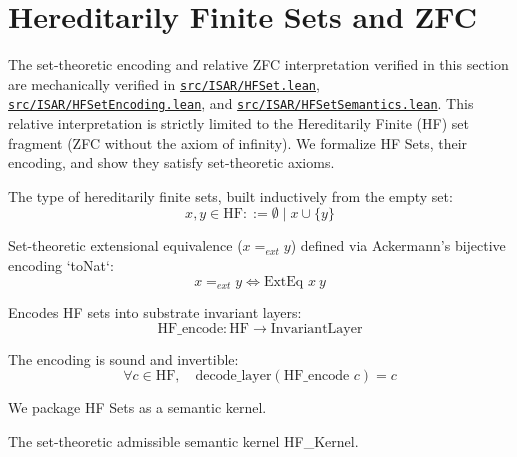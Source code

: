 \section{Hereditarily Finite Sets and ZFC}

The set-theoretic encoding and relative ZFC interpretation verified in this section are mechanically verified in \href{https://github.com/cypoe/isar-proofs/blob/master/src/ISAR/HFSet.lean}{\texttt{src/ISAR/HFSet.lean}}, \href{https://github.com/cypoe/isar-proofs/blob/master/src/ISAR/HFSetEncoding.lean}{\texttt{src/ISAR/HFSetEncoding.lean}}, and \href{https://github.com/cypoe/isar-proofs/blob/master/src/ISAR/HFSetSemantics.lean}{\texttt{src/ISAR/HFSetSemantics.lean}}. This relative interpretation is strictly limited to the Hereditarily Finite (HF) set fragment (ZFC without the axiom of infinity). We formalize HF Sets, their encoding, and show they satisfy set-theoretic axioms.

\begin{definition}[HF Sets]
The type of hereditarily finite sets, built inductively from the empty set:
$$x, y \in \text{HF} ::= \emptyset \mid x \cup \{y\}$$
\end{definition}

\begin{definition}
Set-theoretic extensional equivalence ($x =_{ext} y$) defined via Ackermann's bijective encoding `toNat`:
$$x =_{ext} y \iff \text{ExtEq } x\ y$$
\end{definition}

\begin{definition}
Encodes HF sets into substrate invariant layers:
$$\text{HF\_encode} : \text{HF} \to \text{InvariantLayer}$$
\end{definition}

\begin{theorem}
The encoding is sound and invertible:
$$\forall c \in \text{HF}, \quad \text{decode\_layer}(\text{HF\_encode } c) = c$$
\end{theorem}

We package HF Sets as a semantic kernel.

\begin{definition}
The set-theoretic admissible semantic kernel HF\_Kernel.
\end{definition}

